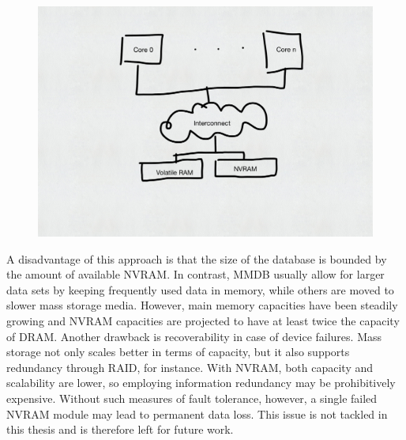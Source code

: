 \begin{figure}[!ht]
    \centering
    \includegraphics[scale=0.5]{figures/drafts/concept-sys-mem.pdf}
    \caption{}
    \label{fig:concept-sys-mem}
\end{figure}

A disadvantage of this approach is that the size of the database is bounded by
the amount of available NVRAM. In contrast, MMDB usually allow for larger data
sets by keeping frequently used data in memory, while others are moved to slower
mass storage media. However, main memory capacities have been steadily growing
and NVRAM capacities are projected to have at least twice the capacity of DRAM.
Another drawback is recoverability in case of device failures. Mass storage not
only scales better in terms of capacity, but it also supports redundancy through
RAID, for instance. With NVRAM, both capacity and scalability are lower, so
employing information redundancy may be prohibitively expensive. Without such
measures of fault tolerance, however, a single failed NVRAM module may lead to
permanent data loss. This issue is not tackled in this thesis and is therefore
left for future work.
